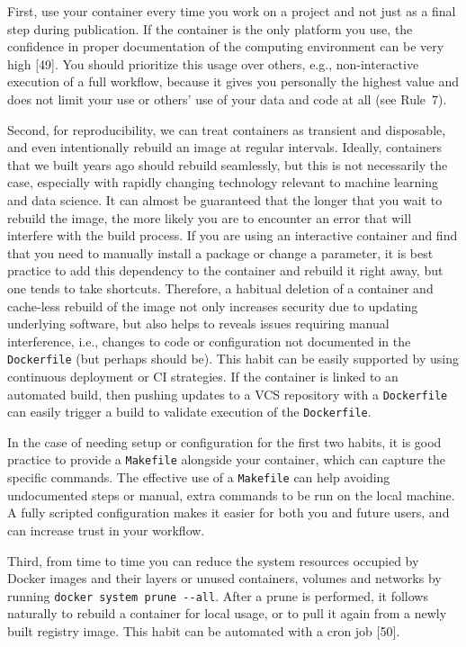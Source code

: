 \documentclass[10pt,letterpaper]{article}
\begin{document}
First, use your container every time you work on a project and not just
as a final step during publication. If the container is the only
platform you use, the confidence in proper documentation of the
computing environment can be very high {[}49{]}. You should prioritize
this usage over others, e.g., non-interactive execution of a full
workflow, because it gives you personally the highest value and does not
limit your use or others' use of your data and code at all (see Rule~7).

Second, for reproducibility, we can treat containers as transient and
disposable, and even intentionally rebuild an image at regular
intervals. Ideally, containers that we built years ago should rebuild
seamlessly, but this is not necessarily the case, especially with
rapidly changing technology relevant to machine learning and data
science. It can almost be guaranteed that the longer that you wait to
rebuild the image, the more likely you are to encounter an error that
will interfere with the build process. If you are using an interactive
container and find that you need to manually install a package or change
a parameter, it is best practice to add this dependency to the container
and rebuild it right away, but one tends to take shortcuts. Therefore, a
habitual deletion of a container and cache-less rebuild of the image not
only increases security due to updating underlying software, but also
helps to reveals issues requiring manual interference, i.e., changes to
code or configuration not documented in the \texttt{Dockerfile} (but
perhaps should be). This habit can be easily supported by using
continuous deployment or CI strategies. If the container is linked to an
automated build, then pushing updates to a VCS repository with a
\texttt{Dockerfile} can easily trigger a build to validate execution of
the \texttt{Dockerfile}.

In the case of needing setup or configuration for the first two habits,
it is good practice to provide a \texttt{Makefile} alongside your
container, which can capture the specific commands. The effective use of
a \texttt{Makefile} can help avoiding undocumented steps or manual,
extra commands to be run on the local machine. A fully scripted
configuration makes it easier for both you and future users, and can
increase trust in your workflow.

Third, from time to time you can reduce the system resources occupied by
Docker images and their layers or unused containers, volumes and
networks by running \texttt{docker\ system\ prune\ -\/-all}. After a
prune is performed, it follows naturally to rebuild a container for
local usage, or to pull it again from a newly built registry image. This
habit can be automated with a cron job {[}50{]}.
\end{document}
